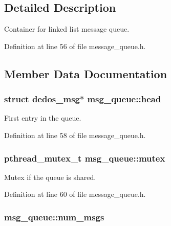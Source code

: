 \subsection{Detailed Description}
Container for linked list message queue. 

Definition at line 56 of file message\-\_\-queue.\-h.



\subsection{Member Data Documentation}
\hypertarget{structmsg__queue_a66440959ccc8955eae8594a9674511cc}{
\subsubsection[{head}]{\setlength{\rightskip}{0pt plus 5cm}struct {\bf dedos\-\_\-msg}$\ast$ msg\-\_\-queue\-::head}}\label{structmsg__queue_a66440959ccc8955eae8594a9674511cc}


First entry in the queue. 



Definition at line 58 of file message\-\_\-queue.\-h.

\hypertarget{structmsg__queue_a5218b92f916543130a579ecf1523ad82}{
\subsubsection[{mutex}]{\setlength{\rightskip}{0pt plus 5cm}pthread\-\_\-mutex\-\_\-t msg\-\_\-queue\-::mutex}}\label{structmsg__queue_a5218b92f916543130a579ecf1523ad82}


Mutex if the queue is shared. 



Definition at line 60 of file message\-\_\-queue.\-h.

\hypertarget{structmsg__queue_a91a341ed44388ff02304c1165b698372}{
\subsubsection[{num\-\_\-msgs}]{ msg\-\_\-queue\-::num\-\_\-msgs}}\label{structmsg__queue_a91a341ed44388ff02304c1165b698372}


